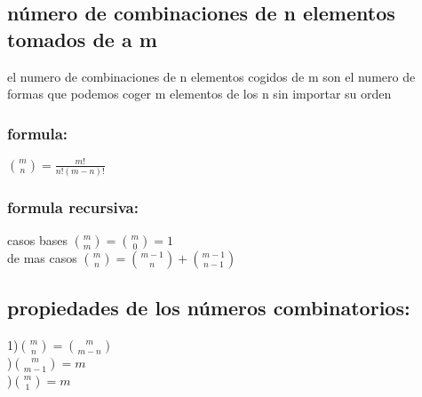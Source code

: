 \subsection{número de combinaciones de n elementos tomados de a m}
el numero de combinaciones de n elementos cogidos de m son el numero de formas que podemos coger m elementos de los n sin importar su orden\\
\subsubsection{formula:}
$\binom{m}{n}=\frac{m!}{n!(m-n)!}$
\subsubsection{formula recursiva:}
  casos bases $\binom{m}{m}=\binom{m}{0}=1$\\
  \indent de mas casos $\binom{m}{n}=\binom{m-1}{n}+\binom{m-1}{n-1}$
\subsection{propiedades de los números combinatorios:}
  1)$\binom{m}{n}=\binom{m}{m-n}$\\
  )$\binom{m}{m-1}=m$\\
  )$\binom{m}{1}=m$
